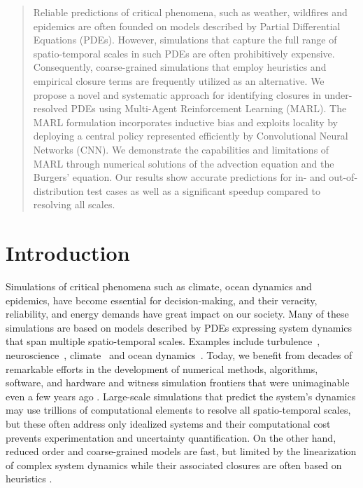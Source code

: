 \documentclass{article}
\theoremstyle{plain}
\theoremstyle{definition}
\theoremstyle{remark}
\begin{document}
\begin{abstract}
Reliable predictions of critical phenomena, such as weather, wildfires and  epidemics are often founded on models described by Partial Differential Equations (PDEs). However, simulations that capture the full range of spatio-temporal scales in such PDEs are often prohibitively expensive. Consequently, coarse-grained simulations that employ heuristics and empirical closure terms are frequently utilized as an alternative. We propose a novel and systematic approach for identifying closures in under-resolved PDEs using Multi-Agent Reinforcement Learning (MARL). The MARL formulation incorporates inductive bias and exploits locality by deploying a central policy represented efficiently by Convolutional Neural Networks (CNN). We demonstrate the capabilities and limitations of MARL through numerical solutions of the advection equation and the Burgers' equation. Our results show accurate predictions for in- and out-of-distribution test cases as well as a significant speedup compared to resolving all scales.
\end{abstract}

\section{Introduction}
Simulations of critical phenomena such as climate,  ocean dynamics and epidemics, have become essential for decision-making, and their veracity, reliability, and energy demands have great impact on our society. Many of these simulations are based on models described by PDEs expressing system dynamics that span multiple spatio-temporal scales. Examples include  turbulence~\cite{wilcox1988multiscale}, neuroscience~\cite{dura2019netpyne}, climate~\cite{climatenas} and  ocean dynamics~\cite{mahadevan2016impact}. Today, we benefit from decades of remarkable efforts in the development of  numerical methods, algorithms, software, and hardware and witness simulation frontiers that were unimaginable even a few years ago \cite{hey2009fourth}. 
Large-scale simulations that predict the system's dynamics may use trillions of computational elements\cite{rossinelli2013a} to resolve all spatio-temporal scales, but these often address only idealized systems and their computational cost prevents experimentation and uncertainty quantification.  On the other hand, reduced order and coarse-grained models are fast, but limited by the linearization of complex system dynamics  while  their associated closures are often based on heuristics \cite{peng2021multiscale}.
 
\end{document}
